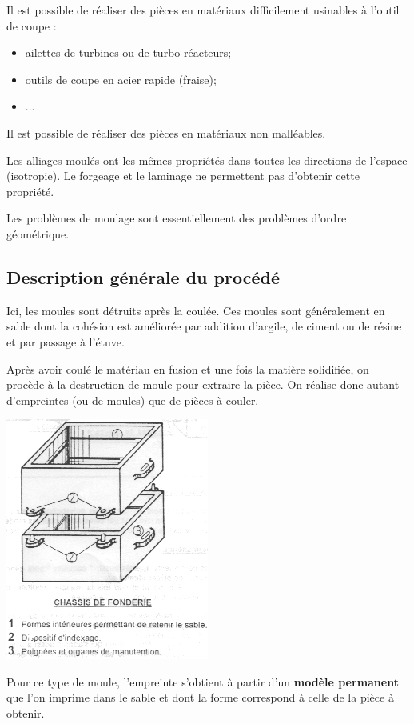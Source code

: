 \documentclass[11pt,oneside]{article}
\begin{document}
Il est possible de réaliser des pièces en matériaux difficilement usinables à
l'outil de coupe : 
\begin{itemize}
 \item ailettes de turbines ou de turbo réacteurs;
\item outils de coupe en acier rapide (fraise);
\item ...
\end{itemize}

Il est possible de réaliser des pièces en matériaux non malléables. 

Les alliages moulés ont les mêmes propriétés dans toutes les directions de
l'espace (isotropie). Le forgeage et le laminage ne permettent pas d'obtenir
cette propriété.

Les problèmes de moulage sont essentiellement des problèmes d'ordre géométrique.


\subsection{Description générale du procédé}
\begin{multicols}{2}
 
Ici, les moules sont détruits après la coulée. Ces moules sont généralement en
sable dont la cohésion est améliorée par addition d'argile, de ciment ou de
résine et par passage à l'étuve. 

Après avoir coulé le matériau en fusion et une fois la matière solidifiée, on
procède à la destruction de moule pour extraire la pièce. On réalise donc
autant d'empreintes (ou de moules) que de pièces à couler. 

\begin{center}
 \includegraphics[width=.25\textwidth]{png/chassis}
\end{center}

\end{multicols}

Pour ce type de moule, l'empreinte s'obtient à partir d'un \textbf{modèle
permanent} que l'on imprime dans le sable et dont la forme correspond à celle
de la pièce à obtenir. 
\end{document}
